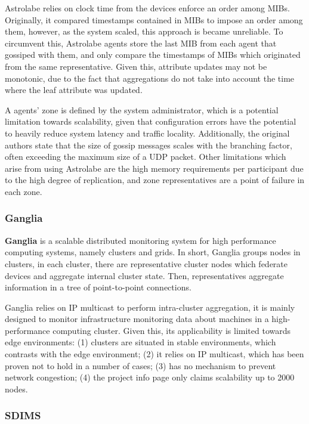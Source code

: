 Astrolabe relies on clock time from the devices enforce an order among MIBs. Originally, it compared timestamps contained in MIBs to impose an order among them, however, as the system scaled, this approach is became unreliable. To circumvent this, Astrolabe agents store the last MIB from each agent that gossiped with them, and only compare the timestamps of MIBs which originated from the same representative. Given this, attribute updates may not be monotonic, due to the fact that aggregations do not take into account the time where the leaf attribute was updated. 

A agents' zone is defined by the system administrator, which is a potential limitation towards scalability, given that configuration errors have the potential to heavily reduce system latency and traffic locality. Additionally, the original authors state that the size of gossip messages scales with the branching factor, often exceeding the maximum size of a UDP packet. Other limitations which arise from using Astrolabe are the high memory requirements per participant due to the high degree of replication, and zone representatives are a point of failure in each zone. 

\subsubsection{Ganglia}

\textbf{Ganglia} \cite{massie2004ganglia} is a scalable distributed monitoring system for high performance computing systems, namely clusters and grids. In short, Ganglia groups nodes in clusters, in each cluster, there are representative cluster nodes which federate devices and aggregate internal cluster state. Then, representatives aggregate information in a tree of point-to-point connections.

Ganglia relies on IP multicast to perform intra-cluster aggregation, it is mainly designed to monitor infrastructure monitoring data about machines in a high-performance computing cluster. Given this, its applicability is limited towards edge environments: (1) clusters are situated in stable environments, which contrasts with the edge environment; (2) it relies on IP multicast, which has been proven not to hold in a number of cases; (3) has no mechanism to prevent network congestion; (4) the project info page only claims scalability up to 2000 nodes.

\subsubsection{SDIMS}

